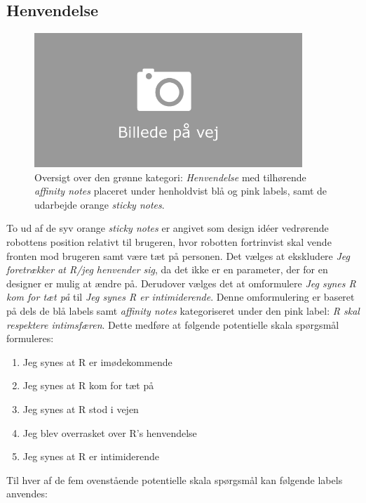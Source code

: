 \subsection{Henvendelse}
\label{ParametreHenvendelse}
%
\begin{figure}[H]
\centering
\includegraphics[width = 0.9\textwidth]{Figure/AffinityDiagram/Henvendelse} 
\caption{Oversigt over den grønne kategori: \textit{Henvendelse} med tilhørende \textit{affinity notes} placeret under henholdvist blå og pink labels, samt de udarbejde orange \textit{sticky notes}.}
\label{fig:AFHenvendelse}
\end{figure}
\noindent
%
To ud af de syv orange \textit{sticky notes} er angivet som design idéer vedrørende robottens position relativt til brugeren, hvor robotten fortrinvist skal vende fronten mod brugeren samt være tæt på personen. Det vælges at ekskludere \textit{Jeg foretrækker at R/jeg henvender sig}, da det ikke er en parameter, der for en designer er mulig at ændre på. Derudover vælges det at omformulere \textit{Jeg synes R kom for tæt på} til \textit{Jeg synes R er intimiderende}. Denne omformulering er baseret på dels de blå labels samt \textit{affinity notes} kategoriseret under den pink label: \textit{R skal respektere intimsfæren}. Dette medføre at følgende potentielle skala spørgsmål formuleres: \blankline
%
\begin{enumerate}
  \item Jeg synes at R er imødekommende
  \item Jeg synes at R kom for tæt på
  \item Jeg synes at R stod i vejen
  \item Jeg blev overrasket over R's henvendelse 
  \item Jeg synes at R er intimiderende\blankline
\end{enumerate}
%
Til hver af de fem ovenstående potentielle skala spørgsmål kan følgende labels anvendes:
%
